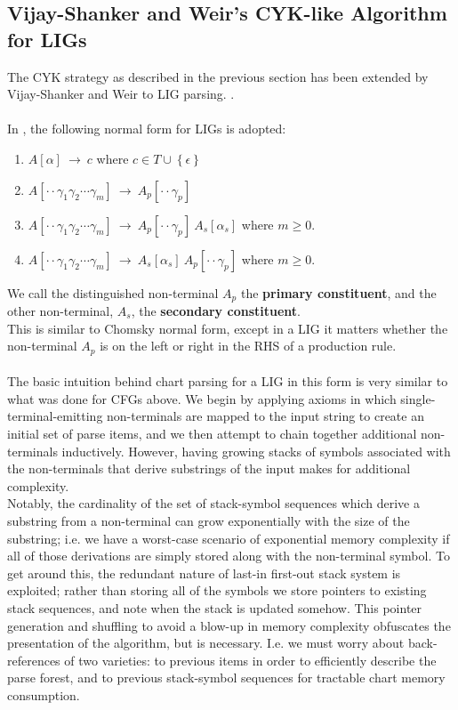 \documentclass[11pt]{article}
\begin{document}
\subsection {Vijay-Shanker and Weir's CYK-like Algorithm for LIGs}
The CYK strategy as described in the previous section has been extended by Vijay-Shanker and Weir to
LIG parsing. \cite{Vijay-Shanker1993}. \\ \\
In \cite{Vijay-Shanker1993}, the following normal form for LIGs is adopted: \\
\begin{enumerate}
  \item $A[\alpha] \ \rightarrow \ c$ where $c \in T \cup \left \{ \epsilon \right \}$
  \item $A[\cdot \cdot \gamma_1 \gamma_2 \cdots \gamma_m] \ \rightarrow \ A_p[\cdot \cdot \gamma_p]$
  \item $A[\cdot \cdot \gamma_1 \gamma_2 \cdots \gamma_m] \ \rightarrow \ A_p[\cdot \cdot \gamma_p] \ A_s[\alpha_s]$ where $m \ge 0$.
  \item $A[\cdot \cdot \gamma_1 \gamma_2 \cdots \gamma_m] \ \rightarrow \ A_s[\alpha_s] \ A_p[\cdot \cdot \gamma_p]$ where $m \ge 0$.
\end{enumerate}
We call the distinguished non-terminal $A_p$ the {\bf primary constituent}, and the
other non-terminal, $A_s$, the {\bf secondary constituent}. \\
This is similar to Chomsky normal form, except in a LIG it matters whether the
non-terminal $A_p$ is on the left or right in the RHS of a production rule. \\
\ \\
The basic intuition behind chart parsing for a LIG in this form is very similar to what was done for CFGs above.
We begin by applying axioms in which single-terminal-emitting non-terminals are mapped to the input string to
create an initial set of parse items, and we then attempt to chain together additional non-terminals inductively.
However, having growing stacks of symbols associated with the non-terminals that derive substrings of the input 
makes for additional complexity. \\
Notably, the cardinality of the set of stack-symbol sequences which derive a substring from a non-terminal can grow
exponentially with the size of the substring; i.e. we have a worst-case scenario of exponential memory complexity if all
of those derivations are simply stored along with the non-terminal symbol. To get around this, the redundant nature of
last-in first-out stack system is exploited; rather than storing all of the symbols we store pointers to existing stack sequences,
and note when the stack is updated somehow. This pointer generation and shuffling to avoid a blow-up in memory complexity obfuscates
the presentation of the algorithm, but is necessary. I.e. we must worry about back-references of two varieties: to previous items in
order to efficiently describe the parse forest, and to previous stack-symbol sequences for tractable chart memory consumption. \\
\end{document}
